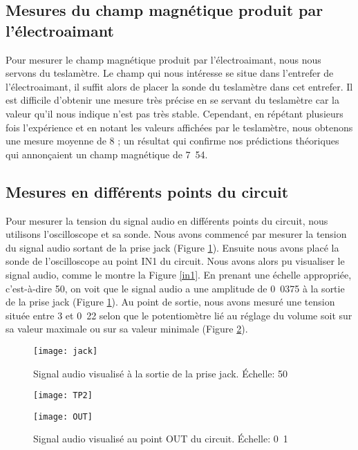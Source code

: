 \subsection{Mesures du champ magnétique produit par l'électroaimant}
Pour mesurer le champ magnétique produit par l'électroaimant, nous nous servons du teslamètre.
Le champ qui nous intéresse se situe dans l'entrefer de l'électroaimant, il suffit alors de placer
la sonde du teslamètre dans cet entrefer. Il est difficile d'obtenir une mesure très précise en se
servant du teslamètre car la valeur qu'il nous indique n'est pas très stable. Cependant, en répétant
plusieurs fois l'expérience et en notant les valeurs affichées par le teslamètre, nous obtenons une mesure
moyenne de \unit{8}{\centi\tesla} ; un résultat qui confirme nos prédictions théoriques
qui annonçaient un champ magnétique de \unit{7.54}{\centi\tesla}.

\subsection{Mesures en différents points du circuit}
Pour mesurer la tension du signal audio en différents points du circuit, nous utilisons l'oscilloscope
et sa sonde.
Nous avons commencé par mesurer la tension du signal audio sortant de la prise jack (Figure \ref{jack}). Ensuite nous avons
placé la sonde de l'oscilloscope au point IN1 du circuit. Nous avons alors pu visualiser le
signal audio, comme le montre la Figure \ref{in1}.
En prenant une échelle appropriée, c'est-à-dire \unit{50}{\milli\volt}, on voit que le signal
audio a une amplitude de \unit{0.0375}{\volt} à la sortie de la prise jack (Figure \ref{jack}).
Au point de sortie, nous avons mesuré une tension située entre \unit{3}{\volt}
et \unit{0.22}{\volt} selon que le potentiomètre lié au réglage du volume
soit sur sa valeur maximale ou sur sa valeur minimale (Figure \ref{out}).

\begin{figure}[ht]
	\centering
	\texttt{[image: jack]}
	\caption{Signal audio visualisé à la sortie de la prise jack. Échelle: \unit{50}{\milli\volt}}
	\label{jack}
\end{figure}

\begin{figure}[ht]
	\begin{minipage}[c]{.45\linewidth}
			\begin{center}
				\texttt{[image: TP2]}
				\caption{Signal audio visualisé au point TP2 du circuit. Échelle: \unit{0.1}{\volt}}
				\label{TP2}
			\end{center}
	\end{minipage}
	\hfill
	\begin{minipage}[c]{.45\linewidth}
			\begin{center}
				\texttt{[image: OUT]}
				\caption{Signal audio visualisé au point OUT du circuit. Échelle: \unit{0.1}{\volt}}
				\label{out}
		\end{center}
	\end{minipage}
\end{figure}


